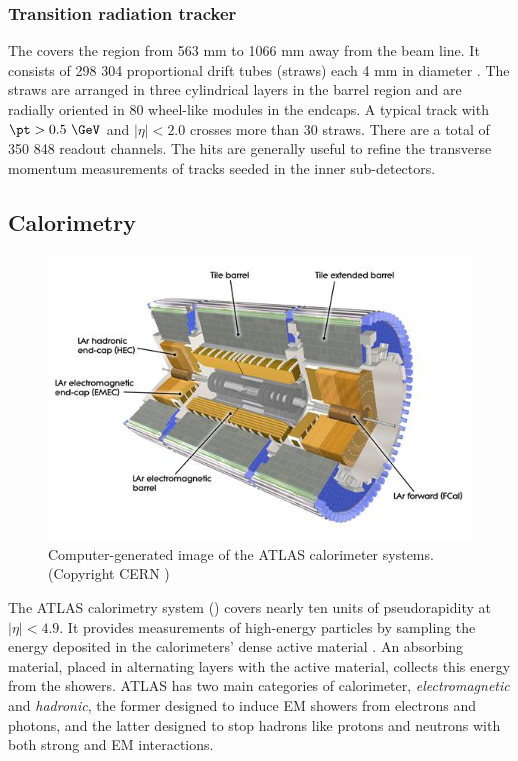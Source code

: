\subsubsection{Transition radiation tracker}

The \trt covers the region from 563 mm to 1066 mm away from the beam line.
It consists of 298 304 proportional drift tubes (straws) each 4 mm in diameter \cite{Abat:2008zza}.
The straws are arranged in three cylindrical layers in the barrel region and are radially oriented in 80 wheel-like modules in the endcaps.
A typical track with $\pt > 0.5~\GeV$ and $|\eta| < 2.0$ crosses more than 30 straws.
There are a total of 350 848 readout channels.
The \trt hits are generally useful to refine the transverse momentum measurements of tracks seeded in the inner sub-detectors.

\subsection{Calorimetry}
\label{sec:atlas:calo}

\begin{figure}[t]
\includegraphics{calorimeter.jpg}
\caption{Computer-generated image of the ATLAS calorimeter systems. (Copyright CERN \cite{Pequenao:1095927})}
\label{fig:atlas_calorimeter}
\end{figure}

The ATLAS calorimetry system () covers nearly ten units of pseudorapidity at $|\eta| < 4.9$.
It provides measurements of high-energy particles by sampling the energy deposited in the calorimeters' dense active material \cite{Airapetian:1996iv}. %
An absorbing material, placed in alternating layers with the active material, collects this energy from the showers.
ATLAS has two main categories of calorimeter, \emph{electromagnetic} and \emph{hadronic}, the former designed to induce \ac{EM} showers from electrons and photons, and the latter designed to stop hadrons like protons and neutrons with both strong and \ac{EM} interactions.

